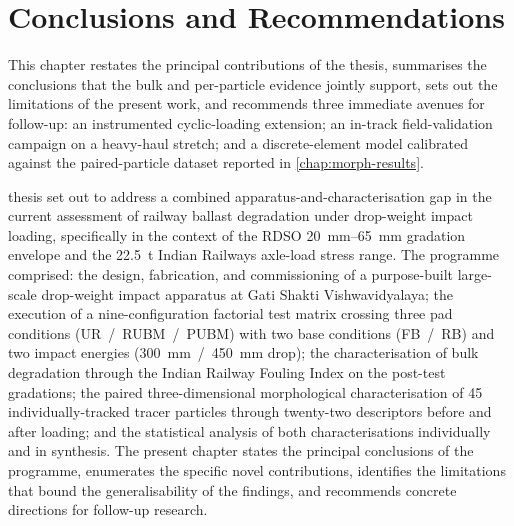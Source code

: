\chapter[Conclusions]{Conclusions and Recommendations}
\label{chap:conclusions}


\begin{chapterpreview}
This chapter restates the principal contributions of the thesis,
summarises the conclusions that the bulk and per-particle evidence
jointly support, sets out the limitations of the present work, and
recommends three immediate avenues for follow-up: an instrumented
cyclic-loading extension; an in-track field-validation campaign on a
heavy-haul stretch; and a discrete-element model calibrated against
the paired-particle dataset reported in \cref{chap:morph-results}.
\end{chapterpreview}

 thesis set out to address a combined apparatus-and-characterisation
gap in the current assessment of railway ballast degradation under
drop-weight impact loading, specifically in the context of the \gls{RDSO}
\SIrange{20}{65}{\milli\metre} gradation envelope and the
\SI{22.5}{\tonne} Indian Railways axle-load stress range. The programme
comprised: the design, fabrication, and commissioning of a purpose-built
large-scale drop-weight impact apparatus at Gati Shakti Vishwavidyalaya;
the execution of a nine-configuration factorial test matrix crossing
three pad conditions (\gls{UR}~/~\gls{RUBM}~/~\gls{PUBM}) with two base
conditions (\gls{FB}~/~\gls{RB}) and two impact energies
(\SI{300}{\milli\metre}~/~\SI{450}{\milli\metre} drop); the
characterisation of bulk degradation through the Indian Railway Fouling
Index \FIIN{} on the post-test gradations; the paired three-dimensional
morphological characterisation of 45 individually-tracked tracer particles
through twenty-two descriptors before and after loading; and the
statistical analysis of both characterisations individually and in
synthesis. The present chapter states the principal conclusions of the
programme, enumerates the specific novel contributions, identifies the
limitations that bound the generalisability of the findings, and recommends
concrete directions for follow-up research.

